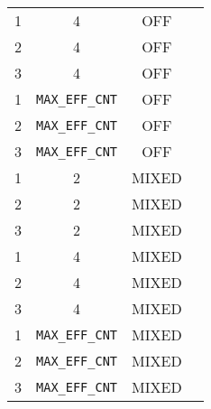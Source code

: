 \begin{table}[ht]
\begin{tabular}{c | c | c | c }
	   1	& 4 & OFF & \\ 
	   2	& 4 & OFF & \\ 
	   3	& 4 & OFF & \\ 
	   1	& {\tt MAX\_EFF\_CNT} & OFF & \\ 
	   2	& {\tt MAX\_EFF\_CNT}  & OFF & \\ 
	   3	& {\tt MAX\_EFF\_CNT}  & OFF & \\ 
	   1	& 2 & MIXED & \\ 
	   2	& 2 & MIXED & \\ 
	   3	& 2 & MIXED & \\ 
	   1	& 4 & MIXED & \\ 
	   2	& 4 & MIXED & \\ 
	   3	& 4 & MIXED & \\ 
	   1	& {\tt MAX\_EFF\_CNT} & MIXED & \\ 
	   2	& {\tt MAX\_EFF\_CNT}  & MIXED & \\ 
	   3	& {\tt MAX\_EFF\_CNT}  & MIXED & \\ 
	   \hline\hline
	\end{tabular}
\end{table}








